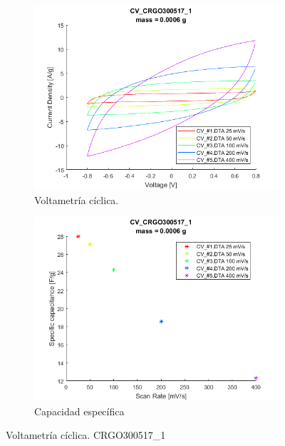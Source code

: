 \begin{figure}
	\centering
	{
		\begin{subfigure}{0.6\textwidth}
			\includegraphics[width=\textwidth]{./Data/CV_CRGO300517_1.png}
			\caption{Voltametría cíclica.}
		\end{subfigure}
		\begin{subfigure}{0.6\textwidth}
			\includegraphics[width=\textwidth]{./Data/SC_CRGO300517_1.png}
			\caption{Capacidad específica}
		\end{subfigure}
	}
	\caption{Voltametría cíclica. CRGO300517\_1}
	\label{fig:CV_CRGO300517_1}
\end{figure}
	


